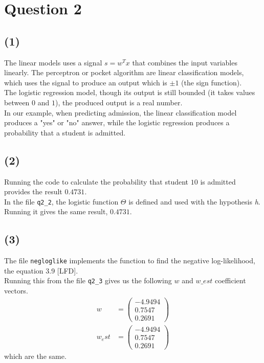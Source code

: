 \documentclass[a4paper]{article}
\begin{document}
\newpage
\section*{Question 2}
\subsection*{(1)}
The linear models uses a signal $s=w^Tx$ that combines the input variables linearly. The perceptron or pocket algorithm are linear classification models, which uses the signal to produce an output which is $\pm 1$ (the sign function).\\
The logistic regression model, though its output is still bounded (it takes values between $0$ and $1$), the produced output is a real number.\\
In our example, when predicting admission, the linear classification model produces a "yes" or "no" answer, while the logistic regression produces a probability that a student is admitted.

\subsection*{(2)}
Running the code to calculate the probability that student $10$ is admitted provides the result $0.4731$.\\
In the file \texttt{q2\_2}, the logistic function $\Theta$ is defined and used with the hypothesis \textit{h}. Running it gives the same result, $0.4731$.

\subsection*{(3)}
The file \texttt{negloglike} implements the function to find the negative log-likelihood, the equation 3.9 [LFD]. \\
Running this from the file \texttt{q2\_3} gives us the following $w$ and $w\_est$ coefficient vectors.
\begin{align*}
w &=
\begin{pmatrix}
   -4.9494 \\
    0.7547 \\
    0.2691
\end{pmatrix}
\\
w_est &=
\begin{pmatrix}
   -4.9494 \\
    0.7547 \\
    0.2691 
\end{pmatrix}
\end{align*}
which are the same.
\end{document}
